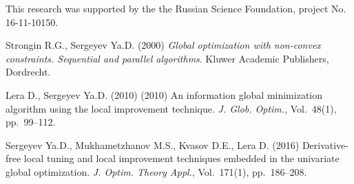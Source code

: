 \documentclass[oribibl]{llncs}
\begin{document}
This research was supported by the the Russian Science Foundation, project No.\,16-11-10150.

\vspace{0.5cm}

\begin{thebibliography}{4}

 Strongin R.G., Sergeyev Ya.D. (2000) \emph{Global optimization with non-convex constraints. Sequential and parallel algorithms}. Kluwer Academic Publishers, Dordrecht.

 Lera D., Sergeyev Ya.D. (2010)  (2010) An information global minimization algorithm using the local improvement technique. \emph{J. Glob. Optim.}, Vol.~48(1), pp.~99--112.

 Sergeyev Ya.D., Mukhametzhanov M.S., Kvasov D.E., Lera D. (2016) Derivative-free local tuning and local improvement techniques embedded in the univariate global optimization. \emph{J. Optim. Theory Appl.}, Vol.~171(1), pp.~186--208.



\end{thebibliography}
\end{document}
